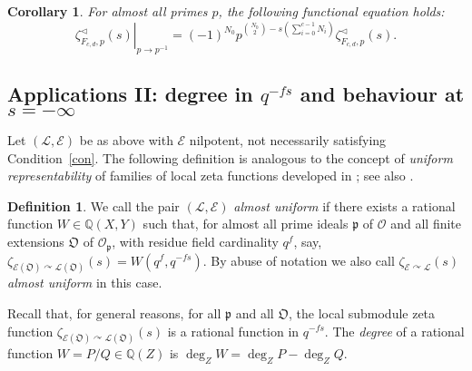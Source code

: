 \documentclass[11pt]{amsart}
\numberwithin{equation}{section}
\numberwithin{figure}{section}
\theoremstyle{plain}
\newtheorem{corollary}[theorem]{Corollary}
\theoremstyle{definition}
\newtheorem{definition}[theorem]{Definition}
\theoremstyle{remark}
\begin{document}
\begin{corollary}\label{cor:free}
For almost all primes $p$, the following functional equation holds:
$$\left.\zeta^{\triangleleft}_{F_{c,d},p}(s) \right|_{p {\rightarrow} p^{-1}} = (-1)^{N_0}p^{\binom{N_0}{2}-s\left(\sum_{i=0}^{c-1}N_i\right)}\zeta^{\triangleleft}_{F_{c,d},p}(s).$$
\end{corollary}

\subsection{Applications II: degree in $q^{-fs}$ and behaviour at
  $s=-\infty$} 

Let $({\ensuremath{\mathcal{L}}},{\mathcal{E}})$ be as above with ${\mathcal{E}}$ nilpotent, not necessarily
satisfying Condition~\ref{con}. The following definition is analogous
to the concept of \emph{uniform representability} of families of local
zeta functions developed in \cite[Section~3]{Rossmann/15a}; see also
\cite[\S~1.2.4]{duSWoodward/08}.

\begin{definition}\label{def:uni}
  We call the pair $({\ensuremath{\mathcal{L}}},{\mathcal{E}})$ \emph{almost uniform} if there exists
  a rational function $W\in{\ensuremath{\mathbb{Q}}}(X,Y)$ such that, for almost all prime
  ideals ${\mathfrak{p}}$ of ${\ensuremath{\mathcal{O}}}$ and all finite extensions ${\mathfrak O}$ of
  ${\ensuremath{\mathcal{O}}}_{\mathfrak{p}}$, with residue field cardinality $q^f$, say,
  $\zeta_{{\mathcal{E}}({\mathfrak O}){\curvearrowright} {\ensuremath{\mathcal{L}}}({\mathfrak O})}(s) = W(q^f,q^{-fs})$. By abuse of
  notation we also call $\zeta_{{\mathcal{E}}{\curvearrowright} {\ensuremath{\mathcal{L}}}}(s)$ \emph{almost
    uniform} in this case.
\end{definition}

Recall that, for general reasons, for all ${\mathfrak{p}}$ and all ${\mathfrak O}$, the
local submodule zeta function $\zeta_{{\mathcal{E}}({\mathfrak O}){\curvearrowright}{\ensuremath{\mathcal{L}}}({\mathfrak O})}(s)$ is
a rational function in $q^{-fs}$. The \emph{degree} of a rational
function $W=P/Q\in{\ensuremath{\mathbb{Q}}}(Z)$ is $\deg_Z W = \deg_Z P - \deg_Z Q$.
\end{document}

